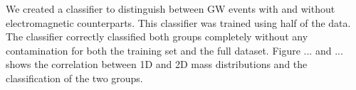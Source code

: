 We created a classifier to distinguish between GW events with and without electromagnetic counterparts. This classifier was trained using half of the data. The classifier correctly classified both groups completely without any contamination for both the training set and the full dataset. Figure ... and ... shows the correlation between 1D and 2D mass distributions and the classification of the two groups.
